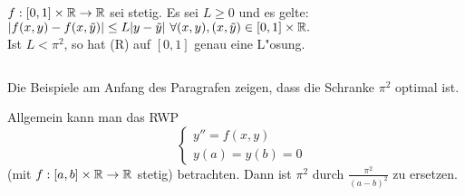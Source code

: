 \documentclass{article}
\begin{document}
\begin{satz}
$f:[0,1]\times \mathbb{R} \to \mathbb{R}$ sei stetig. Es sei $L \ge 0$ und es gelte:\\
$|f(x,y)-f(x,\tilde y)|\le L|y-\tilde y|\ \forall(x,y),(x,\tilde y) \in [0,1] \times \MdR.$\\
Ist $L < \pi^2$, so hat (R) auf $[0,1]$ genau eine L"osung.
\end{satz}
\begin{bemerkung}$\ $
  \begin{liste}
   \item Die Beispiele am Anfang des Paragrafen zeigen, dass die Schranke $\pi^2$ optimal ist.
   \item Allgemein kann man das RWP 
    \[ \quad 
      \begin{cases}
        y''=f(x,y)\\
	y(a)=y(b)=0
      \end{cases}
    \]
    (mit $f:[a,b]\times\mathbb{R}\to\mathbb{R}$ stetig) betrachten. Dann ist $\pi^2$ durch $\frac{\pi^2}{(a-b)^2}$ zu ersetzen.
  \end{liste}
\end{bemerkung}
\end{document}
